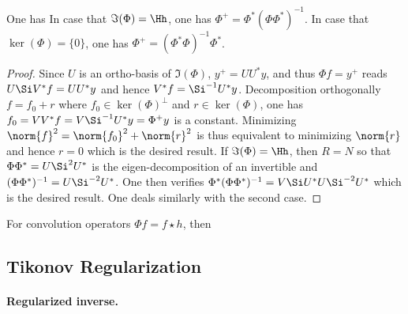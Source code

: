\begin{prop}\label{prop-pseudo-inv}
	One has
	In case that $\Im(\Phi)=\Hh$, one has $\Phi^+ = \Phi^* (\Phi\Phi^*)^{-1}$.
	In case that $\ker(\Phi)=\{0\}$, one has $\Phi^+ = (\Phi^* \Phi)^{-1} \Phi^*$.
\end{prop}

\begin{proof}
	Since $U$ is an ortho-basis of $\Im(\Phi)$, $y^+=UU^* y$, and thus $\Phi f=y^+$ reads
	$U \Si V^* f = UU^* y$ and hence $V^* f = \Si^{-1} U^* y$. Decomposition orthogonally $f=f_0+r$ where $f_0 \in \ker(\Phi)^\bot$ and $r \in \ker(\Phi)$, one has $f_0=VV^* f = V \Si^{-1} U^* y = \Phi^+ y$ is a constant. Minimizing $\norm{f}^2=\norm{f_0}^2+\norm{r}^2$ is thus equivalent to minimizing $\norm{r}$ and hence $r=0$ which is the desired result.
	If $\Im(\Phi)=\Hh$, then $R=N$ so that $\Phi\Phi^* = U \Si^2 U^*$ is the eigen-decomposition of an invertible and $(\Phi\Phi^*)^{-1} = U \Si^{-2} U^*$.
	One then verifies $\Phi^* (\Phi\Phi^*)^{-1} = V \Si U^* U \Si^{-2} U^*$ which is the desired result.
	One deals similarly with the second case. 
\end{proof}

For convolution operators $\Phi f = f \star h$, then 




\subsection{Tikonov Regularization}

\paragraph{Regularized inverse.}


